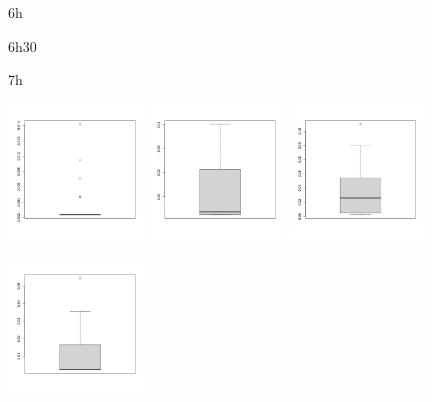 \begin{figure}[H]
	\centering
	\begin{minipage}{0.32\textwidth}
		\centering
		6h
	\end{minipage}
	\begin{minipage}{0.32\textwidth}
		\centering
		6h30
	\end{minipage}
	\begin{minipage}{0.32\textwidth}
		\centering
		7h
	\end{minipage}
	\begin{minipage}{\linewidth}
		\centering
		\includegraphics[width=0.32\textwidth]{Images/pv_pre/6h.png}
		\includegraphics[width=0.32\textwidth]{Images/pv_pre/06:30:00.jpg}
		\includegraphics[width=0.32\textwidth]{Images/pv_pre/07:00:00.jpg}
	\end{minipage}
	\begin{minipage}{\linewidth}
		\centering
		\includegraphics[width=0.32\textwidth]{Images/pv_pre/20:30:00.jpg}

\end{minipage}
\end{figure}
